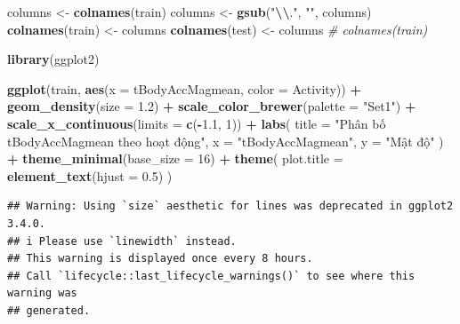 \documentclass[
]{article}
\newenvironment{Shaded}{\begin{snugshade}}{\end{snugshade}}
\newcommand{\AttributeTok}[1]{\textcolor[rgb]{0.13,0.29,0.53}{#1}}
\newcommand{\CommentTok}[1]{\textcolor[rgb]{0.56,0.35,0.01}{\textit{#1}}}
\newcommand{\DecValTok}[1]{\textcolor[rgb]{0.00,0.00,0.81}{#1}}
\newcommand{\FloatTok}[1]{\textcolor[rgb]{0.00,0.00,0.81}{#1}}
\newcommand{\FunctionTok}[1]{\textcolor[rgb]{0.13,0.29,0.53}{\textbf{#1}}}
\newcommand{\NormalTok}[1]{#1}
\newcommand{\OtherTok}[1]{\textcolor[rgb]{0.56,0.35,0.01}{#1}}
\newcommand{\SpecialCharTok}[1]{\textcolor[rgb]{0.81,0.36,0.00}{\textbf{#1}}}
\newcommand{\StringTok}[1]{\textcolor[rgb]{0.31,0.60,0.02}{#1}}
\begin{document}
\begin{Shaded}
\begin{Highlighting}[]
\NormalTok{columns }\OtherTok{\textless{}{-}} \FunctionTok{colnames}\NormalTok{(train)}
\NormalTok{columns }\OtherTok{\textless{}{-}} \FunctionTok{gsub}\NormalTok{(}\StringTok{"}\SpecialCharTok{\textbackslash{}\textbackslash{}}\StringTok{."}\NormalTok{, }\StringTok{""}\NormalTok{, columns)}
\FunctionTok{colnames}\NormalTok{(train) }\OtherTok{\textless{}{-}}\NormalTok{ columns}
\FunctionTok{colnames}\NormalTok{(test) }\OtherTok{\textless{}{-}}\NormalTok{ columns}
\CommentTok{\# colnames(train)}
\end{Highlighting}
\end{Shaded}

\begin{Shaded}
\begin{Highlighting}[]
\FunctionTok{library}\NormalTok{(ggplot2)}

\FunctionTok{ggplot}\NormalTok{(train, }\FunctionTok{aes}\NormalTok{(}\AttributeTok{x =}\NormalTok{ tBodyAccMagmean, }\AttributeTok{color =}\NormalTok{ Activity)) }\SpecialCharTok{+}
  \FunctionTok{geom\_density}\NormalTok{(}\AttributeTok{size =} \FloatTok{1.2}\NormalTok{) }\SpecialCharTok{+}
  \FunctionTok{scale\_color\_brewer}\NormalTok{(}\AttributeTok{palette =} \StringTok{"Set1"}\NormalTok{) }\SpecialCharTok{+}
  \FunctionTok{scale\_x\_continuous}\NormalTok{(}\AttributeTok{limits =} \FunctionTok{c}\NormalTok{(}\SpecialCharTok{{-}}\FloatTok{1.1}\NormalTok{, }\DecValTok{1}\NormalTok{)) }\SpecialCharTok{+} 
  \FunctionTok{labs}\NormalTok{(}
    \AttributeTok{title =} \StringTok{"Phân bố tBodyAccMagmean theo hoạt động"}\NormalTok{,}
    \AttributeTok{x =} \StringTok{"tBodyAccMagmean"}\NormalTok{,}
    \AttributeTok{y =} \StringTok{"Mật độ"}
\NormalTok{  ) }\SpecialCharTok{+}
  \FunctionTok{theme\_minimal}\NormalTok{(}\AttributeTok{base\_size =} \DecValTok{16}\NormalTok{) }\SpecialCharTok{+}
  \FunctionTok{theme}\NormalTok{(}
    \AttributeTok{plot.title =} \FunctionTok{element\_text}\NormalTok{(}\AttributeTok{hjust =} \FloatTok{0.5}\NormalTok{)}
\NormalTok{  )}
\end{Highlighting}
\end{Shaded}

\begin{verbatim}
## Warning: Using `size` aesthetic for lines was deprecated in ggplot2 3.4.0.
## i Please use `linewidth` instead.
## This warning is displayed once every 8 hours.
## Call `lifecycle::last_lifecycle_warnings()` to see where this warning was
## generated.
\end{verbatim}
\end{document}
